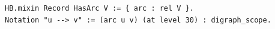 \begin{lstlisting}[language=Rocq]
HB.mixin Record HasArc V := { arc : rel V }.
Notation "u --> v" := (arc u v) (at level 30) : digraph_scope.
\end{lstlisting}
